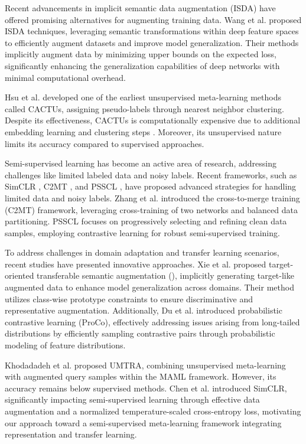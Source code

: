 Recent advancements in implicit semantic data augmentation (ISDA) have offered promising alternatives for augmenting training data. Wang et al. \cite{wang2019implicit, wang2021regularizing} proposed ISDA techniques, leveraging semantic transformations within deep feature spaces to efficiently augment datasets and improve model generalization. Their methods implicitly augment data by minimizing upper bounds on the expected loss, significantly enhancing the generalization capabilities of deep networks with minimal computational overhead.

Hsu et al. \cite{hsu2018unsupervised} developed one of the earliest unsupervised meta-learning methods called CACTUs, assigning pseudo-labels through nearest neighbor clustering. Despite its effectiveness, CACTUs is computationally expensive due to additional embedding learning and clustering steps \cite{hartigan1979algorithm}. Moreover, its unsupervised nature limits its accuracy compared to supervised approaches.

Semi-supervised learning has become an active area of research, addressing challenges like limited labeled data and noisy labels. Recent frameworks, such as SimCLR \cite{chen2020simple}, C2MT \cite{zhang2024cross}, and PSSCL \cite{zhang2025psscl}, have proposed advanced strategies for handling limited data and noisy labels. Zhang et al. \cite{zhang2024cross} introduced the cross-to-merge training (C2MT) framework, leveraging cross-training of two networks and balanced data partitioning. PSSCL \cite{zhang2025psscl} focuses on progressively selecting and refining clean data samples, employing contrastive learning for robust semi-supervised training.

To address challenges in domain adaptation and transfer learning scenarios, recent studies have presented innovative approaches. Xie et al. \cite{xie2024adapting} proposed target-oriented transferable semantic augmentation (), implicitly generating target-like augmented data to enhance model generalization across domains. Their method utilizes class-wise prototype constraints to ensure discriminative and representative augmentation. Additionally, Du et al. \cite{du2024probabilistic} introduced probabilistic contrastive learning (ProCo), effectively addressing issues arising from long-tailed distributions by efficiently sampling contrastive pairs through probabilistic modeling of feature distributions.

Khodadadeh et al. \cite{khodadadeh2019unsupervised} proposed UMTRA, combining unsupervised meta-learning with augmented query samples within the MAML framework. However, its accuracy remains below supervised methods. Chen et al. \cite{chen2020simple} introduced SimCLR, significantly impacting semi-supervised learning through effective data augmentation and a normalized temperature-scaled cross-entropy loss, motivating our approach toward a semi-supervised meta-learning framework integrating representation and transfer learning.

